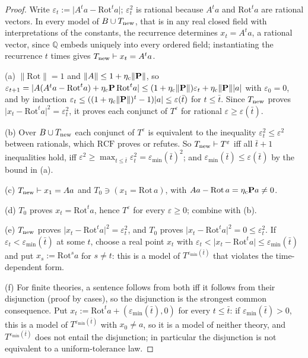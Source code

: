 \begin{proof}
Write $\varepsilon_t:=\lvert A^ta-\mathrm{Rot}^ta\rvert$; $\varepsilon_t^2$ is rational because $A^ta$ and $\mathrm{Rot}^ta$ are rational vectors. In every model of $B\cup T_{\rm new}$, that is in any real closed field with interpretations of the constants, the recurrence determines $x_t=A^ta$, a rational vector, since $\mathbb Q$ embeds uniquely into every ordered field; instantiating the recurrence $t$ times gives $T_{\rm new}\vdash x_t=A^ta$.

(a) $\lVert\mathrm{Rot}\rVert=1$ and $\lVert A\rVert\le1+\eta_{\rm c}\lVert\mathbf P\rVert$, so $\varepsilon_{t+1}=\lvert A(A^ta-\mathrm{Rot}^ta)+\eta_{\rm c}\mathbf P\,\mathrm{Rot}^ta\rvert\le(1+\eta_{\rm c}\lVert\mathbf P\rVert)\varepsilon_t+\eta_{\rm c}\lVert\mathbf P\rVert\lvert a\rvert$ with $\varepsilon_0=0$, and by induction $\varepsilon_t\le((1+\eta_{\rm c}\lVert\mathbf P\rVert)^t-1)\lvert a\rvert\le\varepsilon(\bar t)$ for $t\le\bar t$. Since $T_{\rm new}$ proves $\lvert x_t-\mathrm{Rot}^ta\rvert^2=\varepsilon_t^2$, it proves each conjunct of $T^\varepsilon$ for rational $\varepsilon\ge\varepsilon(\bar t)$.

(b) Over $B\cup T_{\rm new}$ each conjunct of $T^\varepsilon$ is equivalent to the inequality $\varepsilon_t^2\le\varepsilon^2$ between rationals, which $\mathrm{RCF}$ proves or refutes. So $T_{\rm new}\vdash T^\varepsilon$ iff all $\bar t+1$ inequalities hold, iff $\varepsilon^2\ge\max_{t\le\bar t}\varepsilon_t^2=\varepsilon_{\min}(\bar t)^2$; and $\varepsilon_{\min}(\bar t)\le\varepsilon(\bar t)$ by the bound in (a).

(c) $T_{\rm new}\vdash x_1=Aa$ and $T_0\ni(x_1=\mathrm{Rot}\,a)$, with $Aa-\mathrm{Rot}\,a=\eta_{\rm c}\mathbf Pa\ne0$.

(d) $T_0$ proves $x_t=\mathrm{Rot}^ta$, hence $T^\varepsilon$ for every $\varepsilon\ge0$; combine with (b).

(e) $T_{\rm new}$ proves $\lvert x_t-\mathrm{Rot}^ta\rvert^2=\varepsilon_t^2$, and $T_0$ proves $\lvert x_t-\mathrm{Rot}^ta\rvert^2=0\le\varepsilon_t^2$. If $\varepsilon_t<\varepsilon_{\min}(\bar t)$ at some $t$, choose a real point $x_t$ with $\varepsilon_t<\lvert x_t-\mathrm{Rot}^ta\rvert\le\varepsilon_{\min}(\bar t)$ and put $x_s:=\mathrm{Rot}^sa$ for $s\ne t$: this is a model of $T^{\varepsilon_{\min}(\bar t)}$ that violates the time-dependent form.

(f) For finite theories, a sentence follows from both iff it follows from their disjunction (proof by cases), so the disjunction is the strongest common consequence. Put $x_t:=\mathrm{Rot}^ta+(\varepsilon_{\min}(\bar t),0)$ for every $t\le\bar t$: if $\varepsilon_{\min}(\bar t)>0$, this is a model of $T^{\varepsilon_{\min}(\bar t)}$ with $x_0\ne a$, so it is a model of neither theory, and $T^{\varepsilon_{\min}(\bar t)}$ does not entail the disjunction; in particular the disjunction is not equivalent to a uniform-tolerance law.
\end{proof}

